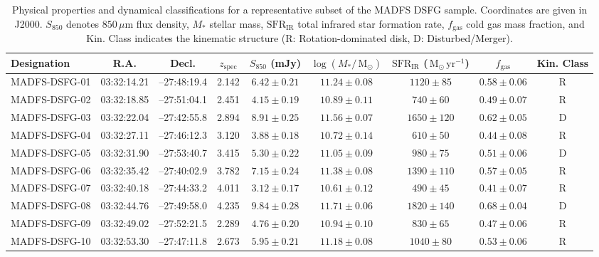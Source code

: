 \documentclass[fleqn,usenatbib]{mnras}
\newcommand{\Msun}{\,\mathrm{M}_\odot}
\begin{document}
\begin{table}
\centering
\caption{Physical properties and dynamical classifications for a representative subset of the MADFS DSFG sample. Coordinates are given in J2000. $S_{850}$ denotes $850\,\mu\mathrm{m}$ flux density, $M_*$ stellar mass, $\mathrm{SFR}_{\mathrm{IR}}$ total infrared star formation rate, $f_{\mathrm{gas}}$ cold gas mass fraction, and Kin. Class indicates the kinematic structure (R: Rotation-dominated disk, D: Disturbed/Merger).}
\label{tab:sample_properties}
\begin{tabular}{lcccccccc}
\hline
Designation & R.A. & Decl. & $z_{\mathrm{spec}}$ & $S_{850}$ (mJy) & $\log(M_*/\Msun)$ & $\mathrm{SFR}_{\mathrm{IR}}$ ($\Msun\,\mathrm{yr}^{-1}$) & $f_{\mathrm{gas}}$ & Kin. Class\\
\hline
MADFS-DSFG-01 & 03:32:14.21 & --27:48:19.4 & 2.142 & $6.42 \pm 0.21$ & $11.24 \pm 0.08$ & $1120 \pm 85$ & $0.58 \pm 0.06$ & R\\
MADFS-DSFG-02 & 03:32:18.85 & --27:51:04.1 & 2.451 & $4.15 \pm 0.19$ & $10.89 \pm 0.11$ & $740 \pm 60$ & $0.49 \pm 0.07$ & R\\
MADFS-DSFG-03 & 03:32:22.04 & --27:42:55.8 & 2.894 & $8.91 \pm 0.25$ & $11.56 \pm 0.07$ & $1650 \pm 120$ & $0.62 \pm 0.05$ & D\\
MADFS-DSFG-04 & 03:32:27.11 & --27:46:12.3 & 3.120 & $3.88 \pm 0.18$ & $10.72 \pm 0.14$ & $610 \pm 50$ & $0.44 \pm 0.08$ & R\\
MADFS-DSFG-05 & 03:32:31.90 & --27:53:40.7 & 3.415 & $5.30 \pm 0.22$ & $11.05 \pm 0.09$ & $980 \pm 75$ & $0.51 \pm 0.06$ & D\\
MADFS-DSFG-06 & 03:32:35.42 & --27:40:02.9 & 3.782 & $7.15 \pm 0.24$ & $11.38 \pm 0.08$ & $1390 \pm 110$ & $0.57 \pm 0.05$ & R\\
MADFS-DSFG-07 & 03:32:40.18 & --27:44:33.2 & 4.011 & $3.12 \pm 0.17$ & $10.61 \pm 0.12$ & $490 \pm 45$ & $0.41 \pm 0.07$ & R\\
MADFS-DSFG-08 & 03:32:44.76 & --27:49:58.0 & 4.235 & $9.84 \pm 0.28$ & $11.71 \pm 0.06$ & $1820 \pm 140$ & $0.68 \pm 0.04$ & D\\
MADFS-DSFG-09 & 03:32:49.02 & --27:52:21.5 & 2.289 & $4.76 \pm 0.20$ & $10.94 \pm 0.10$ & $830 \pm 65$ & $0.47 \pm 0.06$ & R\\
MADFS-DSFG-10 & 03:32:53.30 & --27:47:11.8 & 2.673 & $5.95 \pm 0.21$ & $11.18 \pm 0.08$ & $1040 \pm 80$ & $0.53 \pm 0.06$ & R\\
\hline
\end{tabular}
\end{table}
\end{document}
